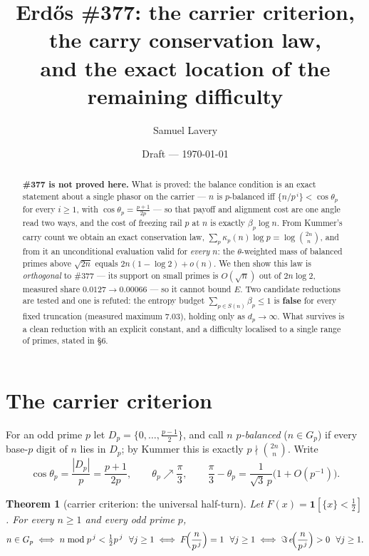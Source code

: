 \documentclass[11pt]{article}
\title{Erd\H{o}s \#377: the carrier criterion, the carry conservation law,\\
and the exact location of the remaining difficulty}
\author{Samuel Lavery}
\date{Draft --- \today}
\newtheorem{theorem}{Theorem}
\begin{document}
\maketitle

\begin{abstract}
\textbf{\#377 is not proved here.}  What is proved: the balance condition is an
exact statement about a single phasor on the carrier --- $n$ is $p$-balanced iff
$\{n/p^{\,i}\}<\cos\theta_p$ for every $i\ge1$, with $\cos\theta_p=\frac{p+1}{2p}$
--- so that payoff and alignment cost are one angle read two ways, and the cost
of freezing rail $p$ at $n$ is exactly $\beta_p\log n$.  From Kummer's carry
count we obtain an exact conservation law, $\sum_p\kappa_p(n)\log p
=\log\binom{2n}{n}$, and from it an unconditional evaluation valid for
\emph{every} $n$: the $\theta$-weighted mass of balanced primes above
$\sqrt{2n}$ equals $2n(1-\log2)+o(n)$.  We then show this law is
\emph{orthogonal} to \#377 --- its support on small primes is $O(\sqrt n)$ out of
$2n\log2$, measured share $0.0127\to0.00066$ --- so it cannot bound $E$.  Two
candidate reductions are tested and one is refuted: the entropy budget
$\sum_{p\in S(n)}\beta_p\le1$ is \textbf{false} for every fixed truncation
(measured maximum $7.03$), holding only as $d_p\to\infty$.  What survives is a
clean reduction with an explicit constant, and a difficulty localised to a
single range of primes, stated in \S6.
\end{abstract}

\section{The carrier criterion}

For an odd prime $p$ let $D_p=\{0,\dots,\frac{p-1}2\}$, and call $n$
\emph{$p$-balanced} ($n\in G_p$) if every base-$p$ digit of $n$ lies in $D_p$;
by Kummer this is exactly $p\nmid\binom{2n}{n}$.  Write
\[
  \cos\theta_p=\frac{|D_p|}{p}=\frac{p+1}{2p},\qquad \theta_p\nearrow\frac\pi3,
  \qquad \frac\pi3-\theta_p=\frac{1}{\sqrt3\,p}\bigl(1+O(p^{-1})\bigr).
\]

\begin{theorem}[carrier criterion: the universal half-turn]\label{thm:carrier}
Let $F(x)=\mathbf 1[\{x\}<\tfrac12]$.  For every $n\ge1$ and every odd prime
$p$,
\[
  n\in G_p
  \iff
  n\bmod p^{\,j}<\tfrac12p^{\,j}\ \ \forall j\ge1
  \iff
  F\!\Bigl(\frac{n}{p^{\,j}}\Bigr)=1\ \ \forall j\ge1
  \iff
  \Im\, e\!\Bigl(\frac{n}{p^{\,j}}\Bigr)>0\ \ \forall j\ge1 .
\]
\end{theorem}
\end{document}
